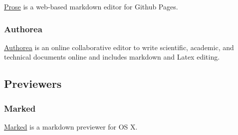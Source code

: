 \documentclass[	DIV=calc,%
							paper=a4,%
							fontsize=10pt]{scrartcl}	 					%
\begin{document}
\href{http://prose.io}{Prose} is a web-based markdown editor for Github
Pages.

\subsubsection{Authorea}\label{authorea}

\href{https://www.authorea.com/}{Authorea} is an online collaborative
editor to write scientific, academic, and technical documents online and
includes markdown and Latex editing.

\subsection{Previewers}\label{previewers}

\subsubsection{Marked}\label{marked}

\href{http://markedapp.com}{Marked} is a markdown previewer for OS X.
\end{document}
